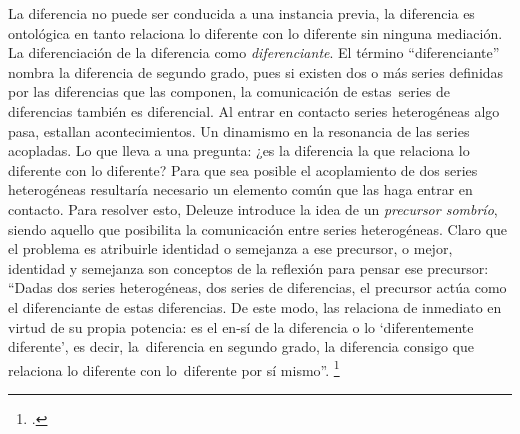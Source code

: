 La diferencia no puede ser conducida a una instancia previa, la diferencia es ontológica en tanto relaciona lo diferente con lo diferente sin ninguna mediación. La diferenciación de la diferencia como \emph{diferenciante}. El término \enquote{diferenciante} nombra la diferencia de segundo grado, pues si existen dos o más series definidas por las diferencias que las componen, la comunicación de estas~series de diferencias también es diferencial. Al entrar en contacto  series heterogéneas algo pasa, estallan acontecimientos. Un dinamismo en la resonancia de las series acopladas. Lo que lleva a una pregunta: ¿es la diferencia la que relaciona lo diferente con lo diferente? Para que sea posible el acoplamiento de dos series heterogéneas resultaría necesario un elemento común que las haga entrar en contacto. Para resolver esto, Deleuze introduce la idea de un \emph{precursor sombrío}, siendo aquello que posibilita la comunicación entre series heterogéneas. Claro que el problema es atribuirle identidad o semejanza a ese precursor, o mejor, identidad y semejanza son conceptos de la reflexión para pensar ese precursor: \enquote{Dadas dos series heterogéneas, dos series de diferencias, el precursor actúa como el diferenciante de estas diferencias. De este modo, las relaciona de inmediato en virtud de su propia potencia: es el en-sí de la diferencia o lo \enquote{diferentemente diferente}, es decir, la~diferencia en segundo grado, la diferencia consigo que relaciona lo diferente con lo~diferente por sí mismo}. \footcite[186]{@6961-DELEUZE2002}

